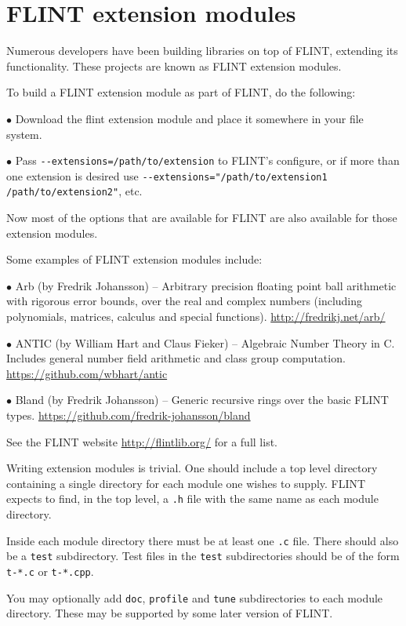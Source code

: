 \documentclass[a4paper,10pt]{book}
\newcommand{\code}{\lstinline}
\begin{document}
\chapter{FLINT extension modules}

Numerous developers have been building libraries on top of FLINT,
extending its functionality. These projects are known as FLINT
extension modules.

To build a FLINT extension module as part of FLINT, do the following:

$\bullet$ Download the flint extension module and place it somewhere
in your file system.

$\bullet$ Pass \code{--extensions=/path/to/extension} to FLINT's
configure, or if more than one extension is desired use
\code{--extensions="/path/to/extension1 /path/to/extension2"},
etc.

Now most of the options that are available for FLINT are also
available for those extension modules.

Some examples of FLINT extension modules include:

$\bullet$ Arb (by Fredrik Johansson) -- Arbitrary precision floating
point ball arithmetic with rigorous error bounds, over the real and
complex numbers (including polynomials, matrices, calculus and special
functions). \url{http://fredrikj.net/arb/}

$\bullet$ ANTIC (by William Hart and Claus Fieker) -- Algebraic Number
Theory in C. Includes general number field arithmetic and class group
computation. \url{https://github.com/wbhart/antic}

$\bullet$ Bland (by Fredrik Johansson) -- Generic recursive rings over
the basic FLINT types. \url{https://github.com/fredrik-johansson/bland}

See the FLINT website \url{http://flintlib.org/} for a full list.

Writing extension modules is trivial. One should include a top level
directory containing a single directory for each module one wishes to
supply. FLINT expects to find, in the top level, a \code{.h} file with
the same name as each module directory.

Inside each module directory there must be at least one \code{.c} file.
There should also be a \code{test} subdirectory. Test files in the
\code{test} subdirectories should be of the form \code{t-*.c} or
\code{t-*.cpp}.

You may optionally add \code{doc}, \code{profile} and \code{tune}
subdirectories to each module directory. These may be supported by some
later version of FLINT.
\end{document}
